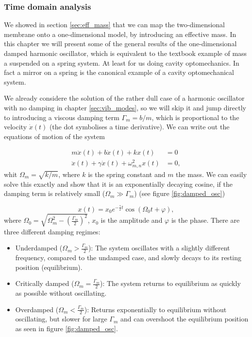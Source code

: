 \subsubsection{Time domain analysis}
We showed in section \ref{sec:eff_mass} that we can map the two-dimensional membrane onto a one-dimensional model, by introducing an effective mass. In this chapter we will present some of the general results of the one-dimensional damped harmonic oscillator, which is equivalent to the textbook example of mass a suspended on a spring system. At least for us doing cavity optomechanics. In fact a mirror on a spring is the canonical example of a cavity optomechanical system.

We already considere the solution of the rather dull case of a harmonic oscillator with no damping in chapter \ref{sec:vib_modes}, so we will skip it and jump directly to introducing a viscous damping term $\Gamma_m = b/m$, which is proportional to the velocity $\dot{x}(t)$ (the dot symbolises a time derivative). We can write out the equations of motion of the system

\begin{align}
m\ddot{x}(t) + b\dot{x}(t) + kx(t) &= 0 \\
\ddot{x}(t) + \gamma\dot{x}(t) + \omega_{m,n}^2x(t) &= 0,
\end{align}
\noindent
whit $\Omega_{m} = \sqrt{k/m}$, where $k$ is the spring constant and $m$ the mass. We can easily solve this exactly and show that it is an exponentially decaying cosine, if the damping term is relatively small ($\Omega_{m} \gg \Gamma_m$) \cite{young2003} (see figure \ref{fig:damped_osc})

\begin{equation}
x(t) = x_0e^{-\frac{\gamma}{2}t}\cos(\Omega_0t + \varphi),
\end{equation}
\noindent
where $\Omega_0 = \sqrt{\Omega_{m}^2 - \left(\frac{\Gamma_m}{2}\right)^2}$, $x_0$ is the amplitude and $\varphi$ is the phase. There are three different damping regimes:

\begin{itemize}
\item Underdamped ($\Omega_m > \frac{\Gamma_m}{2}$): The system oscillates with a slightly different frequency, compared to the undamped case, and slowly decays to its resting position (equilibrium).
\item Critically damped ($\Omega_m = \frac{\Gamma_m}{2}$): The system returns to equilibrium as quickly as possible without oscillating.
\item Overdamped ($\Omega_m < \frac{\Gamma_m}{2}$): Returns exponentially to equilibrium without oscillating, but slower for large $\Gamma_m$ and can overshoot the equilibrium position as seen in figure \ref{fig:damped_osc}.
\end{itemize}


